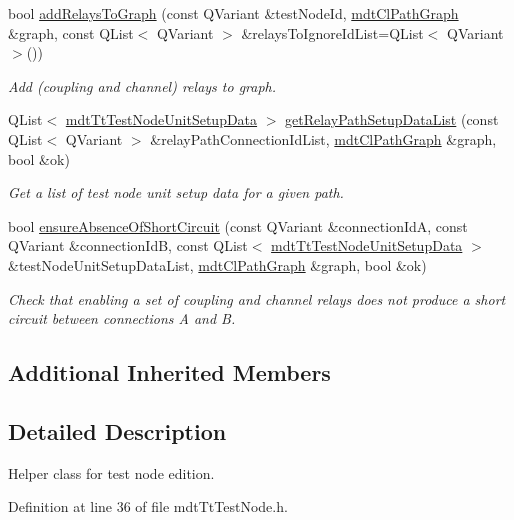 \begin{DoxyCompactItemize}
bool \hyperlink{classmdt_tt_test_node_ade83e368a3cff8fe6704e3c194d5e211}{add\-Relays\-To\-Graph} (const Q\-Variant \&test\-Node\-Id, \hyperlink{classmdt_cl_path_graph}{mdt\-Cl\-Path\-Graph} \&graph, const Q\-List$<$ Q\-Variant $>$ \&relays\-To\-Ignore\-Id\-List=Q\-List$<$ Q\-Variant $>$())
\begin{DoxyCompactList}\small\item\em Add (coupling and channel) relays to graph. \end{DoxyCompactList}\item 
Q\-List$<$ \hyperlink{classmdt_tt_test_node_unit_setup_data}{mdt\-Tt\-Test\-Node\-Unit\-Setup\-Data} $>$ \hyperlink{classmdt_tt_test_node_a2953e3744cd95cab94ef35a7fb308d12}{get\-Relay\-Path\-Setup\-Data\-List} (const Q\-List$<$ Q\-Variant $>$ \&relay\-Path\-Connection\-Id\-List, \hyperlink{classmdt_cl_path_graph}{mdt\-Cl\-Path\-Graph} \&graph, bool \&ok)
\begin{DoxyCompactList}\small\item\em Get a list of test node unit setup data for a given path. \end{DoxyCompactList}\item 
bool \hyperlink{classmdt_tt_test_node_a0e96e3c1ab7b93ec5b7f2b02be44a1ff}{ensure\-Absence\-Of\-Short\-Circuit} (const Q\-Variant \&connection\-Id\-A, const Q\-Variant \&connection\-Id\-B, const Q\-List$<$ \hyperlink{classmdt_tt_test_node_unit_setup_data}{mdt\-Tt\-Test\-Node\-Unit\-Setup\-Data} $>$ \&test\-Node\-Unit\-Setup\-Data\-List, \hyperlink{classmdt_cl_path_graph}{mdt\-Cl\-Path\-Graph} \&graph, bool \&ok)
\begin{DoxyCompactList}\small\item\em Check that enabling a set of coupling and channel relays does not produce a short circuit between connections A and B. \end{DoxyCompactList}\end{DoxyCompactItemize}
\subsection*{Additional Inherited Members}


\subsection{Detailed Description}
Helper class for test node edition. 

Definition at line 36 of file mdt\-Tt\-Test\-Node.\-h.




